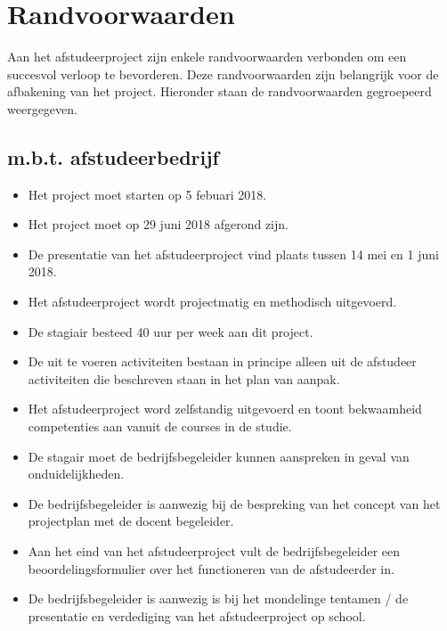 \chapter{Randvoorwaarden}
Aan het afstudeerproject zijn enkele randvoorwaarden verbonden om een succesvol verloop te bevorderen. Deze randvoorwaarden zijn belangrijk voor de afbakening van het project. Hieronder staan de randvoorwaarden gegroepeerd weergegeven.\par

\section{m.b.t. afstudeerbedrijf}
\begin{itemize}
  \item Het project moet starten op 5 febuari 2018.
  \item Het project moet op 29 juni 2018 afgerond zijn.
  \item De presentatie van het afstudeerproject vind plaats tussen 14 mei en 1 juni 2018.
  \item Het afstudeerproject wordt projectmatig en methodisch uitgevoerd.
  \item De stagiair besteed 40 uur per week aan dit project.
  \item De uit te voeren activiteiten bestaan in principe alleen uit de afstudeer activiteiten die beschreven staan in het plan van aanpak.
  \item Het afstudeerproject word zelfstandig uitgevoerd en toont bekwaamheid competenties aan vanuit de courses in de studie.
  \item De stagair moet de bedrijfsbegeleider kunnen aanspreken in geval van onduidelijkheden.
  \item De bedrijfsbegeleider is aanwezig bij de bespreking van het concept van het projectplan met de docent begeleider.
  \item Aan het eind van het afstudeerproject vult de bedrijfsbegeleider een beoordelingsformulier over het functioneren van de afstudeerder in.
  \item De bedrijfsbegeleider is aanwezig is bij het mondelinge tentamen / de presentatie en verdediging van het afstudeerproject op school.
\end{itemize}

